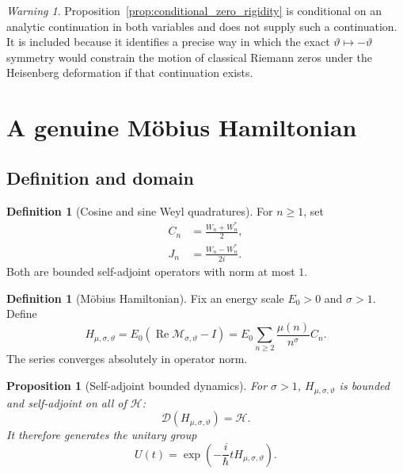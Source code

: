 \documentclass[11pt]{amsart}
\numberwithin{equation}{section}
\theoremstyle{plain}
\newtheorem{proposition}[theorem]{Proposition}
\theoremstyle{definition}
\newtheorem{definition}[theorem]{Definition}
\theoremstyle{remark}
\newtheorem{warning}[theorem]{Warning}
\newcommand{\Hil}{\mathcal{H}}
\newcommand{\Dom}{\mathcal{D}}
\newcommand{\Reop}{\operatorname{Re}}
\begin{document}
\begin{warning}
\label{warn:conditional_zero_result}
Proposition~\ref{prop:conditional_zero_rigidity} is conditional on an analytic
continuation in both variables and does not supply such a continuation.  It
is included because it identifies a precise way in which the exact
$\vartheta\mapsto-\vartheta$ symmetry would constrain the motion of classical
Riemann zeros under the Heisenberg deformation if that continuation exists.
\end{warning}

\section{A genuine M\"obius Hamiltonian}
\label{sec:dynamics}

\subsection{Definition and domain}
\label{subsec:hamiltonian_definition}

\begin{definition}[Cosine and sine Weyl quadratures]
\label{def:Weyl_quadratures}
For $n\ge1$, set
\begin{align}
C_n
&=\frac{W_n+W_n^*}{2},
\label{eq:Cn_definition}\\
J_n
&=\frac{W_n-W_n^*}{2i}.
\label{eq:Jn_definition}
\end{align}
Both are bounded self-adjoint operators with norm at most $1$.
\end{definition}

\begin{definition}[M\"obius Hamiltonian]
\label{def:mobius_hamiltonian}
Fix an energy scale $E_0>0$ and $\sigma>1$.  Define
\begin{equation}
H_{\mu,\sigma,\vartheta}
=
E_0\left(\Reop\mathcal M_{\sigma,\vartheta}-I\right)
=
E_0\sum_{n\ge2}
\frac{\mu(n)}{n^{\sigma}}C_n.
\label{eq:mobius_hamiltonian}
\end{equation}
The series converges absolutely in operator norm.
\end{definition}

\begin{proposition}[Self-adjoint bounded dynamics]
\label{prop:hamiltonian_selfadjoint}
For $\sigma>1$, $H_{\mu,\sigma,\vartheta}$ is bounded and self-adjoint on
all of $\Hil$:
\begin{equation}
\Dom(H_{\mu,\sigma,\vartheta})=\Hil.
\label{eq:hamiltonian_domain}
\end{equation}
It therefore generates the unitary group
\begin{equation}
U(t)=\exp\!\left(-\frac{i}{\hbar}tH_{\mu,\sigma,\vartheta}\right).
\label{eq:time_evolution_unitary}
\end{equation}
\end{proposition}
\end{document}
